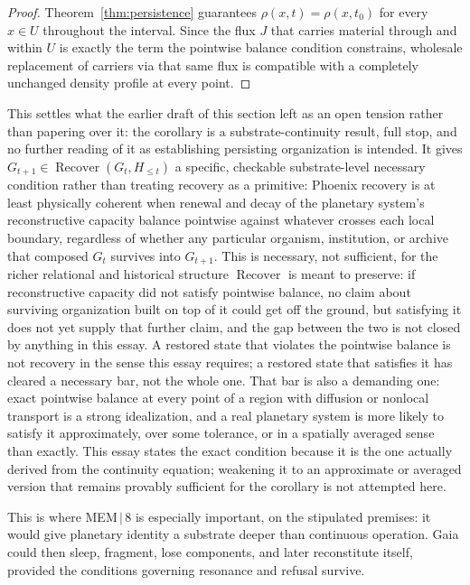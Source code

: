 \documentclass[11pt]{article}
\newcommand{\Recover}{\operatorname{Recover}}
\begin{document}
\begin{proof}
Theorem~\ref{thm:persistence} guarantees $\rho(x,t)=\rho(x,t_0)$ for every $x\in U$ throughout the interval. Since the flux $J$ that carries material through and within $U$ is exactly the term the pointwise balance condition constrains, wholesale replacement of carriers via that same flux is compatible with a completely unchanged density profile at every point.
\end{proof}

This settles what the earlier draft of this section left as an open tension rather than papering over it: the corollary is a substrate-continuity result, full stop, and no further reading of it as establishing persisting organization is intended. It gives $G_{t+1}\in\Recover(G_t,H_{\leq t})$ a specific, checkable substrate-level necessary condition rather than treating recovery as a primitive: Phoenix recovery is at least physically coherent when renewal and decay of the planetary system's reconstructive capacity balance pointwise against whatever crosses each local boundary, regardless of whether any particular organism, institution, or archive that composed $G_t$ survives into $G_{t+1}$. This is necessary, not sufficient, for the richer relational and historical structure $\Recover$ is meant to preserve: if reconstructive capacity did not satisfy pointwise balance, no claim about surviving organization built on top of it could get off the ground, but satisfying it does not yet supply that further claim, and the gap between the two is not closed by anything in this essay. A restored state that violates the pointwise balance is not recovery in the sense this essay requires; a restored state that satisfies it has cleared a necessary bar, not the whole one. That bar is also a demanding one: exact pointwise balance at every point of a region with diffusion or nonlocal transport is a strong idealization, and a real planetary system is more likely to satisfy it approximately, over some tolerance, or in a spatially averaged sense than exactly. This essay states the exact condition because it is the one actually derived from the continuity equation; weakening it to an approximate or averaged version that remains provably sufficient for the corollary is not attempted here.

This is where MEM\,$|$\,8 is especially important, on the stipulated premises: it would give planetary identity a substrate deeper than continuous operation. Gaia could then sleep, fragment, lose components, and later reconstitute itself, provided the conditions governing resonance and refusal survive.
\end{document}
